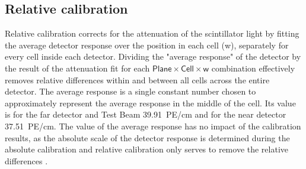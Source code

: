 \subsection{Relative calibration}\label{secRelativCalibration}


Relative calibration corrects for the attenuation of the scintillator light by fitting the average detector response over the position in each cell (w), separately for every cell inside each detector. Dividing the "average response" of the detector by the result of the attenuation fit for each $\textsf{Plane}\times\textsf{Cell}\times\textsf{w}$ combination effectively removes relative differences within and between all cells across the entire detector. The average response is a single constant number chosen to approximately represent the average response in the middle of the cell. Its value is for the far detector and Test Beam 39.91~PE/cm and for the near detector 37.51~PE/cm. The value of the average response has no impact of the calibration results, as the absolute scale of the detector response is determined during the absolute calibration and relative calibration only serves to remove the relative differences \cite{NOVA-doc-7410,NOVA-doc-13579-SAAttenuationAndThreshold}.
 
